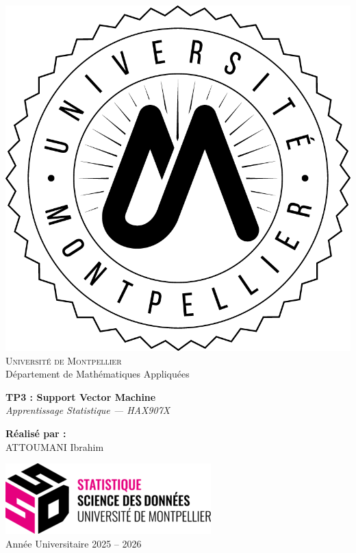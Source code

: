 \documentclass[
  12pt,
]{article}
\author{}
\date{\vspace{-2.5em}}
\begin{document}
\begin{titlepage}

\begin{center}

\includegraphics[width=0.3\linewidth]{vis/logo/logo_m.png}\\[1.5cm]

{\Large \textsc{Université de Montpellier}}\\[0.2cm]
{\large Département de Mathématiques Appliquées}\\[1.5cm]

\begin{tcolorbox}
    \centering
    {\huge \bfseries TP3 : Support Vector Machine}\\[0.3cm]
    {\large \textit{Apprentissage Statistique — HAX907X}}
\end{tcolorbox}

\vfill

\begin{flushright}
    \textbf{Réalisé par :}\\
    ATTOUMANI Ibrahim
\end{flushright}

\vfill

\includegraphics[width=0.25\linewidth]{vis/logo/ssd.png}\\[0.3cm]
{\Large Année Universitaire 2025 -- 2026}

\end{center}
\end{titlepage}

\thispagestyle{empty}

\newpage
\thispagestyle{empty}
\tableofcontents
\newpage
\end{document}
